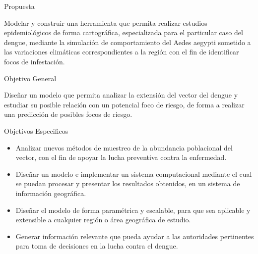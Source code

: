 \begin{frame}[c]{Propuesta}
    \begin{center}
    Modelar y construir una herramienta que permita realizar estudios epidemiológicos de forma
    cartográfica, especializada para el particular caso del dengue, mediante la simulación de
    comportamiento del Aedes aegypti sometido a las variaciones climáticas correspondientes a la
    región con el fin de identificar focos de infestación.
    \end{center}
\end{frame}


\begin{frame}[c]{Objetivo General}
    \begin{center}
    Diseñar un modelo que permita analizar la extensión del vector del dengue y estudiar su posible
    relación con un potencial foco de riesgo, de forma a realizar una predicción de posibles focos
    de riesgo.
    \end{center}
\end{frame}


\begin{frame}[t]{Objetivos Especificos}
    \begin{center}

        \begin{itemize}
        \item Analizar nuevos métodos de muestreo de la abundancia poblacional del vector, con el fin de apoyar la lucha preventiva contra la enfermedad.

        \item Diseñar un modelo e implementar un sistema computacional mediante el cual se puedan procesar y presentar los resultados obtenidos, en un sistema de información geográfica.

        \item Diseñar el modelo de forma paramétrica y escalable, para que sea aplicable y extensible a cualquier región o área geográfica de estudio.

        \item Generar información relevante que pueda ayudar a las autoridades pertinentes para toma de decisiones en la lucha contra el dengue.
        \end{itemize}
    \end{center}
\end{frame}
